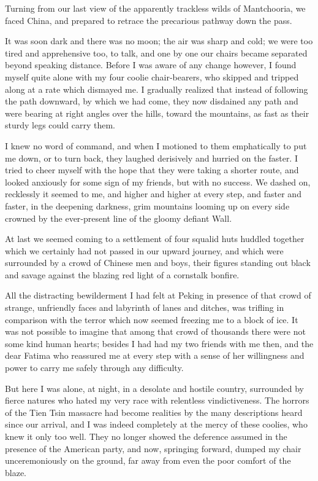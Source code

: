 \documentclass[12pt]{book}
\begin{document}
Turning from our last view of the apparently trackless wilds of Mantchooria,
we faced China, and prepared to retrace the precarious pathway down the pass.

It was soon dark and there was no moon; the air was sharp and cold; we
were too tired and apprehensive too, to talk, and one by one our chairs became
separated beyond speaking distance. Before I was aware of any change however,
I found myself quite alone with my four coolie chair‐bearers, who skipped and
tripped along at a rate which dismayed me. I gradually realized that instead of
following the path downward, by which we had come, they now disdained any
path and were bearing at right angles over the hills, toward the mountains, as
fast as their sturdy legs could carry them.

I knew no word of command, and when I motioned to them emphatically to
put me down, or to turn back, they laughed derisively and hurried on the faster. I
tried to cheer myself with the hope that they were taking a shorter route, and
looked anxiously for some sign of my friends, but with no success. We dashed
on, recklessly it seemed to me, and higher and higher at every step, and faster
and faster, in the deepening darkness, grim mountains looming up on every side
crowned by the ever‐present line of the gloomy defiant Wall.

At last we seemed coming to a settlement of four squalid huts huddled together
which we certainly had not passed in our upward journey, and which were
surrounded by a crowd of Chinese men and boys, their figures standing out black
and savage against the blazing red light of a cornstalk bonfire.

All the distracting bewilderment I had felt at Peking in presence of that crowd
of strange, unfriendly faces and labyrinth of lanes and ditches, was trifling in
comparison with the terror which now seemed freezing me to a block of ice. It
was not possible to imagine that among that crowd of thousands there were not
some kind human hearts; besides I had had my two friends with me then, and the
dear Fatima who reassured me at every step with a sense of her willingness and
power to carry me safely through any difficulty.

But here I was alone, at night, in a desolate and hostile country, surrounded
by fierce natures who hated my very race with relentless vindictiveness. The
horrors of the Tien Tsin massacre had become realities by the many descriptions
heard since our arrival, and I was indeed completely at the mercy of these coolies,
who knew it only too well. They no longer showed the deference assumed in
the presence of the American party, and now, springing forward, dumped my
chair unceremoniously on the ground, far away from even the poor comfort of
the blaze.
\end{document}
